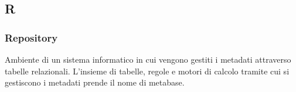 \subsection{R}

\subsubsection{Repository}
Ambiente di un sistema informatico in cui vengono gestiti i metadati attraverso
tabelle relazionali. L'insieme di tabelle, regole e motori di calcolo tramite
cui si gestiscono i metadati prende il nome di metabase.

\newpage
